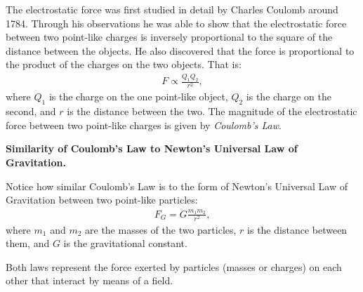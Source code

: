 The electrostatic force was first studied in detail by
Charles Coulomb around 1784. Through his observations he was able
to show that the electrostatic force between two point-like
charges is inversely proportional to the square of the distance
between the objects. He also discovered that the force is
proportional to the product of the charges on the two objects. That is:\\

\begin{eqnarray*}
F \propto \frac{Q_1 Q_2}{r^2},
\end{eqnarray*}
where $Q_1$ is the charge on the one point-like object, $Q_2$ is
the charge on the second, and $r$ is the distance between the two.
The magnitude of the electrostatic force between two point-like
charges is given by \textit{Coulomb's Law}.\\


\textbf{Similarity of Coulomb's Law to Newton's Universal Law
of Gravitation.}

Notice how similar Coulomb's Law is to the form
of Newton's Universal Law of Gravitation between two point-like
particles:
\begin{eqnarray*}
F_G=G\frac{m_1m_2}{r^2},
\end{eqnarray*}
where $m_1$ and $m_2$ are the masses of the two particles, $r$ is
the distance between them, and $G$ is the gravitational constant.

Both laws represent the force exerted by particles (masses or
charges) on each other that interact by means of a field.\\

